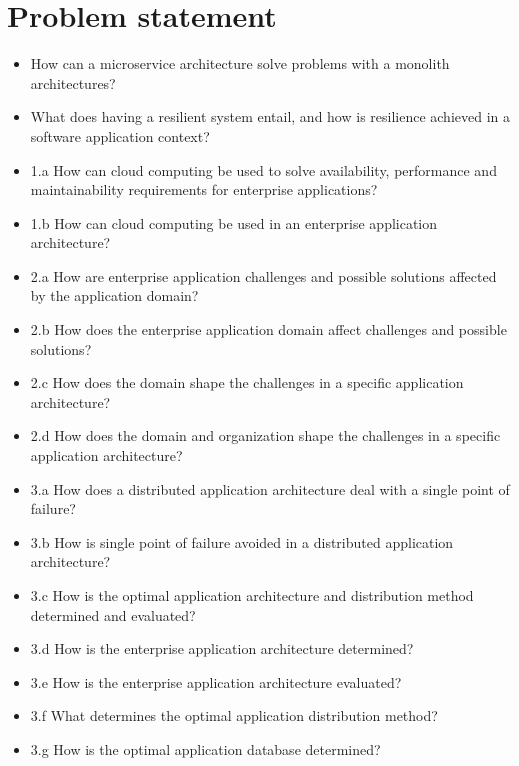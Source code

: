 \section{Problem statement}
\label{sc:problem_statement}

\begin{itemize}
\item How can a microservice architecture solve problems with a monolith architectures?
\item What does having a resilient system entail, and how is resilience achieved in a software application context?
\end{itemize}




\newpage
{}
\begin{itemize}  
\item 1.a How can cloud computing be used to solve availability, performance and maintainability requirements for enterprise applications?
\item 1.b How can cloud computing be used in an enterprise application architecture?

\item 2.a How are enterprise application challenges and possible solutions affected by the application domain?
\item 2.b How does the enterprise application domain affect challenges and possible solutions?
\item 2.c How does the domain shape the challenges in a specific application architecture?
\item 2.d How does the domain and organization shape the challenges in a specific application architecture?

\item 3.a How does a distributed application architecture deal with a single point of failure?
\item 3.b How is single point of failure avoided in a distributed application architecture?
\item 3.c How is the optimal application architecture and distribution method determined and evaluated?
\item 3.d How is the enterprise application architecture determined?
\item 3.e How is the enterprise application architecture evaluated?
\item 3.f What determines the optimal application distribution method?
\item 3.g How is the optimal application database determined?
\end{itemize}
